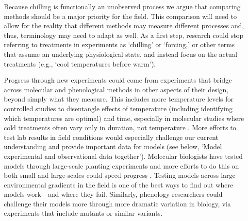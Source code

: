 \documentclass[11pt]{article}
\begin{document}
Because chilling is functionally an unobserved process we argue that comparing methods should be a major priority for the field. This comparison will need to allow for the reality that different methods may measure different processes and, thus, terminology may need to adapt as well. As a first step, research could stop referring to treatments in experiments as `chilling' or `forcing,' or other terms that assume an underlying physiological state, and instead focus on the actual treatments (e.g., `cool temperatures before warm'). 

Progress through new experiments could come from experiments that bridge across molecular and phenological methods in other aspects of their design, beyond simply what they measure. This includes more temperature levels for controlled studies to disentangle effects of temperature (including identifying which temperatures are optimal) and time, especially in molecular studies where cold treatments often vary only in duration, not temperature \citep[e.g.,][]{rinne2011,pan2023epigenetic}. More efforts to test lab results in field conditions would especially challenge our current understanding and provide important data for models (see below, `Model experimental and observational data together'). %
Molecular biologists have tested models through large-scale planting experiments \citep{Wilczek:2009oa,Burghardt2015} and more efforts to do this on both small and large-scales could speed progress \citep{Satake2022}. 
Testing models across large environmental gradients in the field is one of the best ways to find out where models work---and where they fail. Similarly, phenology researchers could challenge their models more through more dramatic variation in biology, via experiments that include mutants or similar variants. 
\end{document}
